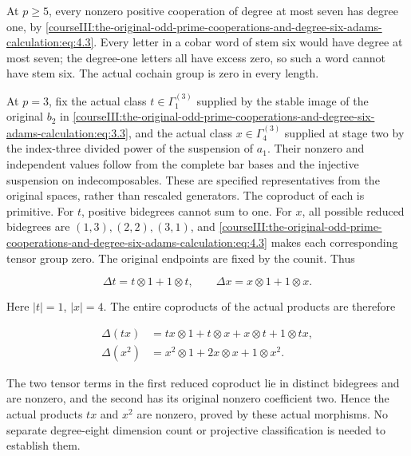 At \(p\geq5\), every nonzero positive cooperation of degree at most seven has degree one, by \eqref{courseIII:the-original-odd-prime-cooperations-and-degree-six-adams-calculation:eq:4.3}. Every letter in a cobar word of stem six would have degree at most seven; the degree-one letters all have excess zero, so such a word cannot have stem six. The actual cochain group is zero in every length.

At \(p=3\), fix the actual class \(t\in\Gamma_1^{(3)}\) supplied by the stable image of the original \(b_2\) in \eqref{courseIII:the-original-odd-prime-cooperations-and-degree-six-adams-calculation:eq:3.3}, and the actual class \(x\in\Gamma_4^{(3)}\) supplied at stage two by the index-three divided power of the suspension of \(a_1\). Their nonzero and independent values follow from the complete bar bases and the injective suspension on indecomposables. These are specified representatives from the original spaces, rather than rescaled generators. The coproduct of each is primitive. For \(t\), positive bidegrees cannot sum to one. For \(x\), all possible reduced bidegrees are \((1,3),(2,2),(3,1)\), and \eqref{courseIII:the-original-odd-prime-cooperations-and-degree-six-adams-calculation:eq:4.3} makes each corresponding tensor group zero. The original endpoints are fixed by the counit. Thus

\begin{equation}
\Delta t=t\otimes1+1\otimes t,\qquad
 \Delta x=x\otimes1+1\otimes x.
 \label{courseIII:the-original-odd-prime-cooperations-and-degree-six-adams-calculation:eq:5.1}
\end{equation}

Here \(|t|=1\), \(|x|=4\). The entire coproducts of the actual products are therefore

\begin{equation}
\begin{aligned}
 \Delta(tx)&=tx\otimes1+t\otimes x+x\otimes t+1\otimes tx,\\
 \Delta(x^2)&=x^2\otimes1+2x\otimes x+1\otimes x^2.
\end{aligned}
\label{courseIII:the-original-odd-prime-cooperations-and-degree-six-adams-calculation:eq:5.2}
\end{equation}

The two tensor terms in the first reduced coproduct lie in distinct bidegrees and are nonzero, and the second has its original nonzero coefficient two. Hence the actual products \(tx\) and \(x^2\) are nonzero, proved by these actual morphisms. No separate degree-eight dimension count or projective classification is needed to establish them.


